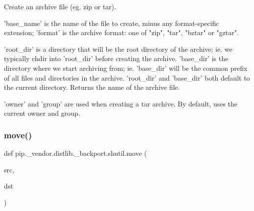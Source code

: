 \begin{DoxyVerb}Create an archive file (eg. zip or tar).

'base_name' is the name of the file to create, minus any format-specific
extension; 'format' is the archive format: one of "zip", "tar", "bztar"
or "gztar".

'root_dir' is a directory that will be the root directory of the
archive; ie. we typically chdir into 'root_dir' before creating the
archive.  'base_dir' is the directory where we start archiving from;
ie. 'base_dir' will be the common prefix of all files and
directories in the archive.  'root_dir' and 'base_dir' both default
to the current directory.  Returns the name of the archive file.

'owner' and 'group' are used when creating a tar archive. By default,
uses the current owner and group.
\end{DoxyVerb}
 \mbox{\label{namespacepip_1_1__vendor_1_1distlib_1_1__backport_1_1shutil_a522df1c40262dc8bea9342864177d387}} 
\subsubsection{\texorpdfstring{move()}{move()}}
{\footnotesize\ttfamily def pip.\+\_\+vendor.\+distlib.\+\_\+backport.\+shutil.\+move (\begin{DoxyParamCaption}\item[{}]{src,  }\item[{}]{dst }\end{DoxyParamCaption})}

